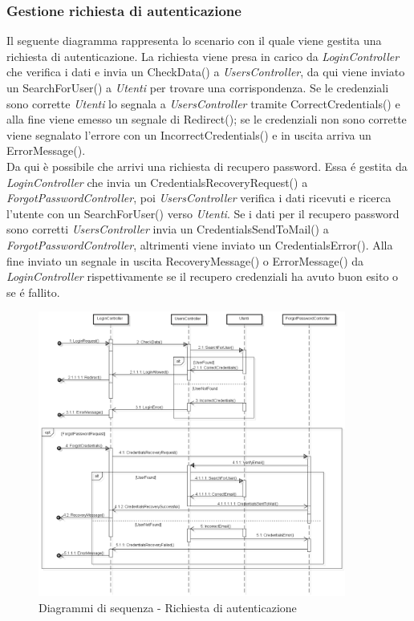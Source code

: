 	\subsubsection{Gestione richiesta di autenticazione}
	Il seguente diagramma rappresenta lo scenario con il quale viene gestita una richiesta di autenticazione. La richiesta viene presa in carico da \textit{LoginController} che verifica i dati e invia un CheckData() a \textit{UsersController}, da qui viene inviato un SearchForUser() a \textit{Utenti} per trovare una corrispondenza. Se le credenziali sono corrette \textit{Utenti} lo segnala a \textit{UsersController} tramite CorrectCredentials() e alla fine viene emesso un segnale di Redirect(); se le credenziali non sono corrette viene segnalato l'errore con un IncorrectCredentials() e in uscita arriva un ErrorMessage().\\
	Da qui è possibile che arrivi una richiesta di recupero password. Essa é gestita da \textit{LoginController} che invia un CredentialsRecoveryRequest() a \textit{ForgotPasswordController}, poi \textit{UsersController} verifica i dati ricevuti e ricerca l'utente con un SearchForUser() verso \textit{Utenti}. Se i dati per il recupero password sono corretti \textit{UsersController} invia un CredentialsSendToMail() a \textit{ForgotPasswordController}, altrimenti viene inviato un CredentialsError(). Alla fine inviato un segnale in uscita RecoveryMessage() o ErrorMessage() da \textit{LoginController} rispettivamente se il recupero credenziali ha avuto buon esito o se é fallito.

	\begin{figure}[H]
		\centering
		\includegraphics[width=0.9\textwidth]{img/login.png}
		\caption{Diagrammi di sequenza - Richiesta di autenticazione}
	\end{figure}

